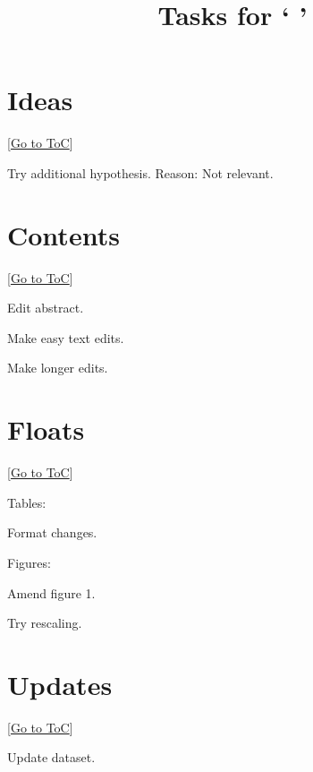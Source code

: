 \documentclass[[a4paper,12pt]{article}
\newcommand{\gototoc}{\vspace{-1.8cm} \null\hfill [\hyperlink{toc}{Go to ToC}] \newline}
\newcommand{\cmark}{\ding{51}}
\newcommand{\xmark}{\ding{55}}
\newcommand{\done}{\rlap{$\square$}{\raisebox{2pt}{\large\hspace{1pt}\cmark}}%
	\hspace{-2.5pt}}
\newcommand{\wontdo}{\rlap{$\square$}{\large\hspace{1pt}\xmark}}
\begin{document}
\title{\vspace{-4ex}Tasks for ` \hspace{-1.4ex}'}
\author{}	\date{}
\maketitle 	\vspace{-4ex}


\section{Ideas}
\gototoc
\begin{todolist}
	\item[\wontdo] Try additional hypothesis. Reason: Not relevant.
\end{todolist}


\section{Contents}
\gototoc
\begin{todolist}
	\item[\done] Edit abstract.
	\item Make easy text edits.
	\item Make longer edits.
\end{todolist}


\section{Floats}
\gototoc
\begin{todolist}
	\item Tables:
	\begin{todolist}
		\item Format changes.
	\end{todolist}
	\item Figures:
	\begin{todolist}
		\item[\done] Amend figure 1.
		\item Try rescaling.
	\end{todolist}
\end{todolist}


\section{Updates}
\gototoc
\begin{todolist}
	\item Update dataset.
\end{todolist}
\end{document}
